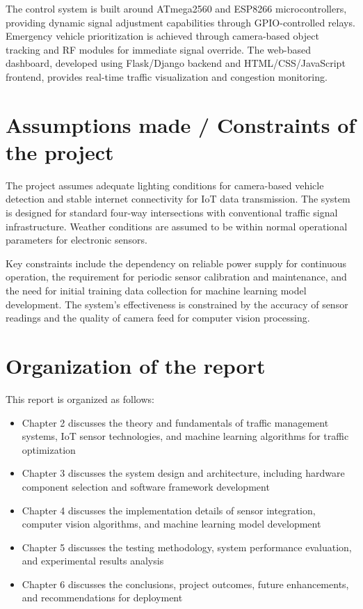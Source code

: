 The control system is built around ATmega2560 and ESP8266 microcontrollers, providing dynamic signal adjustment capabilities through GPIO-controlled relays. Emergency vehicle prioritization is achieved through camera-based object tracking and RF modules for immediate signal override. The web-based dashboard, developed using Flask/Django backend and HTML/CSS/JavaScript frontend, provides real-time traffic visualization and congestion monitoring.

\section[Assumptions made / Constraints of the project]{\textbf{Assumptions made / Constraints of the project}}

The project assumes adequate lighting conditions for camera-based vehicle detection and stable internet connectivity for IoT data transmission. The system is designed for standard four-way intersections with conventional traffic signal infrastructure. Weather conditions are assumed to be within normal operational parameters for electronic sensors.

Key constraints include the dependency on reliable power supply for continuous operation, the requirement for periodic sensor calibration and maintenance, and the need for initial training data collection for machine learning model development. The system's effectiveness is constrained by the accuracy of sensor readings and the quality of camera feed for computer vision processing.

\section[Organization of the report]{\textbf{Organization of the report}}

This report is organized as follows:
\begin{itemize}
\item Chapter 2 discusses the theory and fundamentals of traffic management systems, IoT sensor technologies, and machine learning algorithms for traffic optimization
\item Chapter 3 discusses the system design and architecture, including hardware component selection and software framework development
\item Chapter 4 discusses the implementation details of sensor integration, computer vision algorithms, and machine learning model development
\item Chapter 5 discusses the testing methodology, system performance evaluation, and experimental results analysis
\item Chapter 6 discusses the conclusions, project outcomes, future enhancements, and recommendations for deployment
\end{itemize}